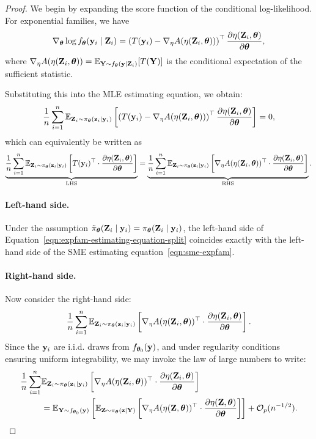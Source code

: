 \documentclass[twoside,11pt]{article}
\begin{document}
\begin{proof}
We begin by expanding the score function of the conditional log-likelihood. For exponential families, we have
\[
\nabla_{\bm{\theta}} \log f_{\bm{\theta}}({\bf y}_i \mid {\bf Z}_i)
= \left( T({\bf y}_i) - \nabla_\eta A(\eta({\bf Z}_i, {\bm{\theta}})) \right)^\top 
\frac{\partial \eta({\bf Z}_i, {\bm{\theta}})}{\partial {\bm{\theta}}},
\]
where \( \nabla_\eta A(\eta({\bf Z}_i, {\bm{\theta}})) = \mathbb{E}_{{\bf Y} \sim f_{\bm{\theta}}({\bf y} \mid {\bf Z}_i)}[T({\bf Y})] \) is the conditional expectation of the sufficient statistic.

Substituting this into the MLE estimating equation, we obtain:
\begin{equation}
\label{eqn:expfam-estimating-equation}
\frac{1}{n} \sum_{i=1}^n 
\mathbb{E}_{{\bf Z}_i \sim \pi_{\bm{\theta}}({\bf z}_i \mid {\bf y}_i)} 
\left[
\left( T({\bf y}_i) - \nabla_\eta A(\eta({\bf Z}_i, {\bm{\theta}})) \right)^\top 
\frac{\partial \eta({\bf Z}_i, {\bm{\theta}})}{\partial {\bm{\theta}}}
\right]
= 0,
\end{equation}
which can equivalently be written as
\begin{equation}
\label{eqn:expfam-estimating-equation-split}
\underbrace{
\frac{1}{n} \sum_{i=1}^n 
\mathbb{E}_{{\bf Z}_i \sim \pi_{\bm{\theta}}({\bf z}_i \mid {\bf y}_i)} 
\left[
T({\bf y}_i)^\top \cdot \frac{\partial \eta({\bf Z}_i, {\bm{\theta}})}{\partial {\bm{\theta}}}
\right]
}_{\text{LHS}}
=
\underbrace{
\frac{1}{n} \sum_{i=1}^n 
\mathbb{E}_{{\bf Z}_i \sim \pi_{\bm{\theta}}({\bf z}_i \mid {\bf y}_i)} 
\left[
\nabla_\eta A(\eta({\bf Z}_i, {\bm{\theta}}))^\top \cdot \frac{\partial \eta({\bf Z}_i, {\bm{\theta}})}{\partial {\bm{\theta}}}
\right]
}_{\text{RHS}}.
\end{equation}

\paragraph{Left-hand side.} Under the assumption \( \tilde \pi_{\bm{\theta}}({\bf Z}_i \mid {\bf y}_i) = \pi_{\bm{\theta}}({\bf Z}_i \mid {\bf y}_i) \), the left-hand side of Equation~\eqref{eqn:expfam-estimating-equation-split} coincides exactly with the left-hand side of the SME estimating equation~\eqref{eqn:sme-expfam}.

\paragraph{Right-hand side.} Now consider the right-hand side:
\[
\frac{1}{n} \sum_{i=1}^n 
\mathbb{E}_{{\bf Z}_i\sim \pi_{\bm{\theta}}({\bf z}_i \mid {\bf y}_i)} 
\left[
\nabla_\eta A(\eta({\bf Z}_i, {\bm{\theta}}))^\top 
\cdot 
\frac{\partial \eta({\bf Z}_i, {\bm{\theta}})}{\partial {\bm{\theta}}}
\right].
\]
Since the \( {\bf y}_i \) are i.i.d. draws from \( f_{{\bm{\theta}}_0}({\bf y}) \), and under regularity conditions ensuring uniform integrability, we may invoke the law of large numbers to write:
\begin{align*}
\frac{1}{n} \sum_{i=1}^n 
&\mathbb{E}_{{\bf Z}_i \sim \pi_{\bm{\theta}}({\bf z}_i \mid {\bf y}_i)} 
\left[
\nabla_\eta A(\eta({\bf Z}_i, {\bm{\theta}}))^\top 
\cdot 
\frac{\partial \eta({\bf Z}_i, {\bm{\theta}})}{\partial {\bm{\theta}}}
\right] \\
&= \mathbb{E}_{{\bf Y} \sim f_{{\bm{\theta}}_0}({\bf y})} 
\left[
\mathbb{E}_{{\bf Z}\sim \pi_{\bm{\theta}}({\bf z} \mid {\bf Y})} 
\left[
\nabla_\eta A(\eta({\bf Z}, {\bm{\theta}}))^\top 
\cdot 
\frac{\partial \eta({\bf Z}, {\bm{\theta}})}{\partial {\bm{\theta}}}
\right]
\right]
+ \mathcal{O}_p(n^{-1/2}).
\end{align*}


\end{proof}
\end{document}
